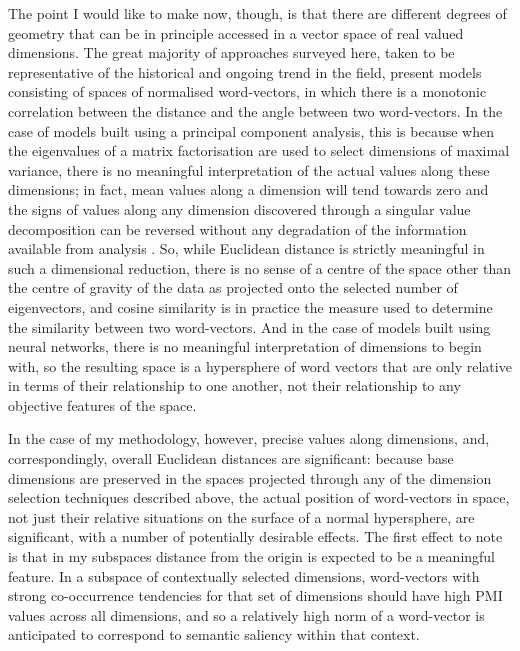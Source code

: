 The point I would like to make now, though, is that there are different degrees of geometry that can be in principle accessed in a vector space of real valued dimensions.  The great majority of approaches surveyed here, taken to be representative of the historical and ongoing trend in the field, present models consisting of spaces of normalised word-vectors, in which there is a monotonic correlation between the distance and the angle between two word-vectors.  In the case of models built using a principal component analysis, this is because when the eigenvalues of a matrix factorisation are used to select dimensions of maximal variance, there is no meaningful interpretation of the actual values along these dimensions; in fact, mean values along a dimension will tend towards zero and the signs of values along any dimension discovered through a singular value decomposition can be reversed without any degradation of the information available from analysis \citep{AbdiEA2010}.  So, while Euclidean distance is strictly meaningful in such a dimensional reduction, there is no sense of a centre of the space other than the centre of gravity of the data as projected onto the selected number of eigenvectors, and cosine similarity is in practice the measure used to determine the similarity between two word-vectors.  And in the case of models built using neural networks, there is no meaningful interpretation of dimensions to begin with, so the resulting space is a hypersphere of word vectors that are only relative in terms of their relationship to one another, not their relationship to any objective features of the space.

In the case of my methodology, however, precise values along dimensions, and, correspondingly, overall Euclidean distances are significant: because base dimensions are preserved in the spaces projected through any of the dimension selection techniques described above, the actual position of word-vectors in space, not just their relative situations on the surface of a normal hypersphere, are significant, with a number of potentially desirable effects.  The first effect to note is that in my subspaces distance from the origin is expected to be a meaningful feature.  In a subspace of contextually selected dimensions, word-vectors with strong co-occurrence tendencies for that set of dimensions should have high PMI values across all dimensions, and so a relatively high norm of a word-vector is anticipated to correspond to semantic saliency within that context.

